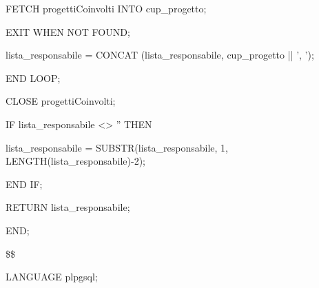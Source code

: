 \begin{flushleft}
\begin{description}
\begin{description}
                                \begin{description}
                                    \item FETCH progettiCoinvolti INTO cup\_progetto;
                                    \item EXIT WHEN NOT FOUND;
                                    \item lista\_responsabile = CONCAT (lista\_responsabile, cup\_progetto || ', ');
                                \end{description}
                                \item END LOOP;
                                \item CLOSE progettiCoinvolti;
                                
                                \vspace{0.5cm}

                                \item IF lista\_responsabile <> '' THEN
                                \begin{description}
                                    \item lista\_responsabile = SUBSTR(lista\_responsabile, 1, LENGTH(lista\_responsabile)-2);
                                \end{description}
                                \item END IF;
                                
                                \item RETURN lista\_responsabile;
                            \end{description}
                        \item END;
                        \item \$\$
                        \item LANGUAGE plpgsql;
                    \end{description}
                \end{flushleft}
            \normalfont    
    


    
